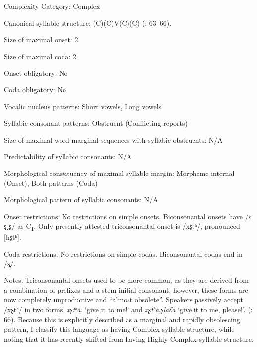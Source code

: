 {\begin{appendixdesc}
\item[Complexity Category:] Complex

\item[Canonical syllable structure:] (C)(C)V(C)(C) (\citealt{Cerrón-Palomino2006}: 63--66).

\item[Size of maximal onset:] 2

\item[Size of maximal coda:] 2

\item[Onset obligatory:] No

\item[Coda obligatory:] No

\item[Vocalic nucleus patterns:] Short vowels, Long vowels

\item[Syllabic consonant patterns:] Obstruent (Conflicting reports)

\item[Size of maximal word-marginal sequences with syllabic obstruents:] N/A

\item[Predictability of syllabic consonants:] N/A

\item[Morphological constituency of maximal syllable margin:] Morpheme-internal (Onset), Both patterns (Coda)

\item[Morphological pattern of syllabic consonants:] N/A

\item[Onset restrictions:] No restrictions on simple onsets. Biconsonantal onsets have /s s̪ ʂ/ as C\textsubscript{1}. Only presently attested triconsonantal onset is /xʂtʰ/, pronounced [hʂtʰ].

\item[Coda restrictions:] No restrictions on simple codas. Biconsonantal codas end in /s̪/.

\item[Notes:] Triconsonantal onsets used to be more common, as they are derived from a combination of prefixes and a stem-initial consonant; however, these forms are now completely unproductive and “almost obsolete”. Speakers passively accept /xʂtʰ/ in two forms, \textit{xʂtʰaː} ‘give it to me!’ and \textit{xʂtʰaːʂlaʎa} ‘give it to me, please!’. (\citealt{Cerrón-Palomino2006}: 66). Because this is explicitly described as a marginal and rapidly obsolescing pattern, I classify this language as having Complex syllable structure, while noting that it has recently shifted from having Highly Complex syllable structure.
\end{appendixdesc}
}
